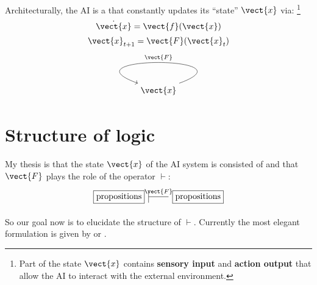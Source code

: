 Architecturally, the AI is a  that constantly updates its ``state'' $\vect{x}$ via: \footnote{Part of the state $\vect{x}$ contains \textbf{sensory input} and \textbf{action output} that allow the AI to interact with the external environment.}
\begin{equation}
\dot{\vect{x}} = \vect{f}(\vect{x})
\end{equation}
\begin{equation}
\vect{x}_{t+1} = \vect{F}(\vect{x}_t)
\end{equation}
\begin{equation}
\label{eqn:AGI-architecture}
\begin{tikzcd}
\vect{x} \arrow[in=160,out=20,loop,looseness=5,swap,"\vect{F}"]
\end{tikzcd}
\end{equation}

\section{Structure of logic}

My thesis is that the state $\vect{x}$ of the AI system is consisted of  and that $\vect{F}$ plays the role of the  operator $\vdash$:
\begin{equation}
\begin{tikzcd}[| /.tip = {Bar[scale=3]}]
\boxed{\mbox{propositions}}
\arrow[r, |-, "\vect{F}"]
& \boxed{\mbox{propositions}}
\end{tikzcd}
\end{equation}

So our goal now is to elucidate the structure of $\vdash$.  Currently the most elegant formulation is given by  or .


